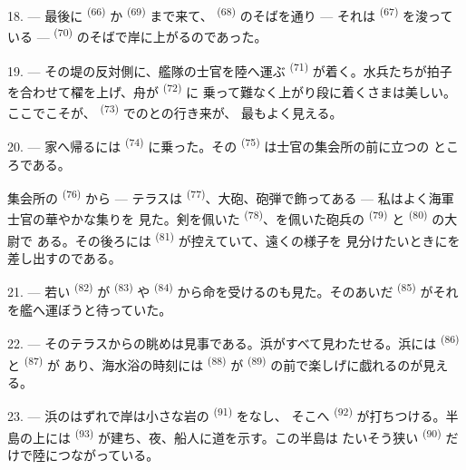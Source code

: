18. --- 最後に \textsuperscript{(66)} か
\textsuperscript{(69)} まで来て、 \textsuperscript{(68)} のそばを通り
--- それは \textsuperscript{(67)} を浚っている --- 
\textsuperscript{(70)} のそばで岸に上がるのであった。

19. --- その堤の反対側に、艦隊の士官を陸へ運ぶ \textsuperscript{(71)}
が着く。水兵たちが拍子を合わせて櫂を上げ、舟が \textsuperscript{(72)} に
乗って難なく上がり段に着くさまは美しい。ここでこそが、
 \textsuperscript{(73)} でのとの行き来が、
最もよく見える。

\VUsaut{3.0mm}
\VUsaut{3.0mm}

20. --- 家へ帰るには \textsuperscript{(74)} に乗った。その
 \textsuperscript{(75)} は士官の集会所の前に立つの
ところである。

集会所の \textsuperscript{(76)} から --- テラスは
\textsuperscript{(77)}、大砲、砲弾で飾ってある --- 私はよく海軍士官の華やかな集りを
見た。剣を佩いた \textsuperscript{(78)}、を佩いた砲兵の
 \textsuperscript{(79)} と \textsuperscript{(80)} の大尉で
ある。その後ろには \textsuperscript{(81)} が控えていて、遠くの様子を
見分けたいときにを差し出すのである。

21. --- 若い \textsuperscript{(82)} が \textsuperscript{(83)}
や \textsuperscript{(84)} から命を受けるのも見た。そのあいだ
 \textsuperscript{(85)} がそれを艦へ運ぼうと待っていた。

22. --- そのテラスからの眺めは見事である。浜がすべて見わたせる。浜には
 \textsuperscript{(86)} と \textsuperscript{(87)} が
あり、海水浴の時刻には \textsuperscript{(88)} が
\textsuperscript{(89)} の前で楽しげに戯れるのが見える。

23. --- 浜のはずれで岸は小さな岩の \textsuperscript{(91)} をなし、
そこへ \textsuperscript{(92)} が打ちつける。半島の上には
 \textsuperscript{(93)} が建ち、夜、船人に道を示す。この半島は
たいそう狭い \textsuperscript{(90)} だけで陸につながっている。

\VUsaut{3.0mm}
\VUsaut{3.0mm}

